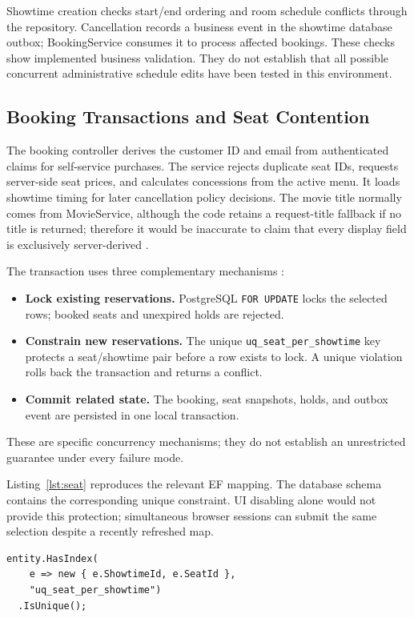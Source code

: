 \documentclass[conference]{IEEEtran}
\newenvironment{keypoints}{\begin{itemize}\setlength{\itemsep}{2pt}%
\setlength{\parsep}{0pt}}{\end{itemize}}
\newcommand{\code}[1]{\texttt{#1}}
\begin{document}
Showtime creation checks start/end ordering and room schedule conflicts through
the repository. Cancellation records a business event in the showtime database
outbox; BookingService consumes it to process affected bookings. These checks
show implemented business validation. They do not establish that all possible
concurrent administrative schedule edits have been tested in this environment.

\subsection{Booking Transactions and Seat Contention}
The booking controller derives the customer ID and email from authenticated
claims for self-service purchases. The service rejects duplicate seat IDs,
requests server-side seat prices, and calculates concessions from the active
menu. It loads showtime timing for later cancellation policy decisions. The
movie title normally comes from MovieService, although the code retains a
request-title fallback if no title is returned; therefore it would be inaccurate
to claim that every display field is exclusively server-derived \cite{booking}.

The transaction uses three complementary mechanisms \cite{booking,db,postgres}:
\begin{keypoints}
\item \textbf{Lock existing reservations.} PostgreSQL \code{FOR UPDATE} locks
the selected rows; booked seats and unexpired holds are rejected.
\item \textbf{Constrain new reservations.} The unique
\code{uq\_seat\_}\allowbreak\code{per\_showtime} key protects a seat/showtime pair before a row
exists to lock. A unique violation rolls back the transaction and returns a conflict.
\item \textbf{Commit related state.} The booking, seat snapshots, holds, and
outbox event are persisted in one local transaction.
\end{keypoints}
These are specific concurrency mechanisms; they do not establish an unrestricted
guarantee under every failure mode.

Listing~\ref{lst:seat} reproduces the relevant EF mapping. The database schema
contains the corresponding unique constraint. UI disabling alone would not
provide this protection; simultaneous browser sessions can submit the same
selection despite a recently refreshed map.
\begin{lstlisting}[language=CSharp,caption={Reservation uniqueness mapping from BookingDbContext.},label={lst:seat}]
entity.HasIndex(
    e => new { e.ShowtimeId, e.SeatId },
    "uq_seat_per_showtime")
  .IsUnique();
\end{lstlisting}
\end{document}
